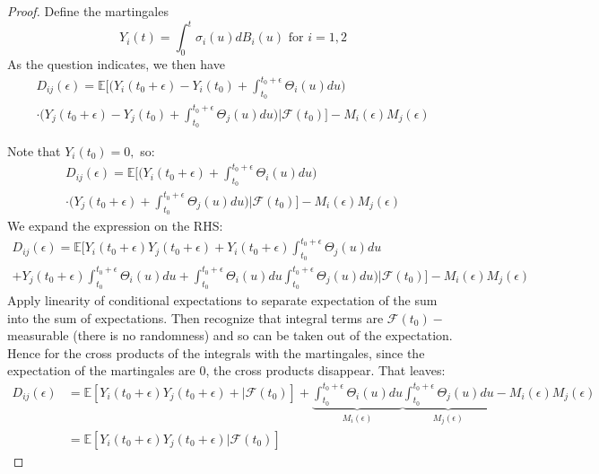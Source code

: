 \documentclass{article}
\newcommand{\E}{\mathbb{E}}
\newcommand{\F}{\mathcal{F}}
\newcommand{\eps}{\epsilon}
\theoremstyle{definition}
\theoremstyle{definition}
\begin{document}
\begin{enumerate}
\begin{enumerate}[(i)]
    \begin{proof} Define the martingales
       $$ Y_i(t)=\int_0^t \sigma_i(u)dB_i(u) \text{ for } i=1,2$$
       As the question indicates, we then have
      \begin{multline*}
           D_{ij}(\eps) = \E \bigg[ \bigg( Y_i(t_0+\eps)-Y_i(t_0)+\int_{t_0}^{t_0+\eps} \Theta_i(u)du \bigg) \\
           \cdot \bigg( Y_j(t_0+\eps)-Y_j(t_0)+\int_{t_0}^{t_0+\eps} \Theta_j(u)du \bigg) \bigg|\F(t_0) \bigg]-M_i(\eps)M_j(\eps) 
       \end{multline*}
       
       Note that $Y_i(t_0)=0,$ so:
           \begin{multline*}
           D_{ij}(\eps) = \E \bigg[ \bigg( Y_i(t_0+\eps)+\int_{t_0}^{t_0+\eps} \Theta_i(u)du \bigg) \\
           \cdot \bigg( Y_j(t_0+\eps)+\int_{t_0}^{t_0+\eps} \Theta_j(u)du \bigg) \bigg|\F(t_0) \bigg]-M_i(\eps)M_j(\eps) 
       \end{multline*}
       We expand the expression on the RHS:
           \begin{multline*}
           D_{ij}(\eps) = \E \bigg[  Y_i(t_0+\eps)Y_j(t_0+\eps)+Y_i(t_0+\eps)\int_{t_0}^{t_0+\eps} \Theta_j(u)du \\
           + Y_j(t_0+\eps)\int_{t_0}^{t_0+\eps} \Theta_i(u)du  +\int_{t_0}^{t_0+\eps} \Theta_i(u)du \int_{t_0}^{t_0+\eps} \Theta_j(u)du \bigg) \bigg|\F(t_0) \bigg]-M_i(\eps)M_j(\eps) 
       \end{multline*}
    Apply linearity of conditional expectations to separate expectation of the sum into the sum of expectations. Then recognize that integral terms are $\F(t_0)-$measurable (there is no randomness) and so can be taken out of the expectation. Hence for the cross products of the integrals with the martingales, since the expectation of the martingales are $0$, the cross products disappear. That leaves:
    \begin{align*}
        D_{ij}(\eps) &= \E\left[Y_i(t_0+\eps)Y_j(t_0+\eps) + \bigg|\F(t_0)  \right] + \underset{M_i(\eps)}{\underbrace{\int_{t_0}^{t_0+\eps} \Theta_i(u)du}} \underset{M_j(\eps)}{\underbrace{\int_{t_0}^{t_0+\eps} \Theta_j(u)du}} - M_i(\eps)M_j(\eps) \\
        & = \E\left[Y_i(t_0+\eps)Y_j(t_0+\eps)  \big|\F(t_0)  \right]
    \end{align*}
    

\end{proof}
\end{enumerate}
\end{enumerate}
\end{document}
